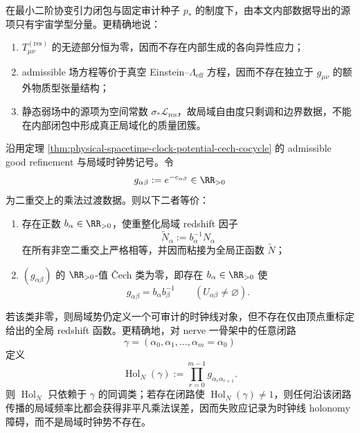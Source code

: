 \begin{corollary}[内部源项的宇宙学型刚性]\label{cor:physical-spacetime-no-localized-matter-source}
在最小二阶协变引力闭包与固定审计种子 \(p_\ast\) 的制度下，由本文内部数据导出的源项只有宇宙学型分量。更精确地说：
\begin{enumerate}
  \item \(T^{(\mathrm{res})}_{\mu\nu}\) 的无迹部分恒为零，因而不存在内部生成的各向异性应力；
  \item admissible 场方程等价于真空 Einstein--\(\Lambda_{\mathrm{eff}}\) 方程，因而不存在独立于 \(g_{\mu\nu}\) 的额外物质型张量结构；
  \item 静态弱场中的源项为空间常数 \(\sigma_\ast\mathcal L_{\mathrm{res}}\)，故局域自由度只剩调和边界数据，不能在内部闭包中形成真正局域化的质量团簇。
\end{enumerate}
\end{corollary}

\begin{theorem}\label{distill:grothendieck-descent_to_closure_theorem_chains-clock-line-descent-holonomy-normal-form}
沿用定理 \ref{thm:physical-spacetime-clock-potential-cech-cocycle} 的 admissible good refinement 与局域时钟势记号。令
\[
g_{\alpha\beta}:=e^{-c_{\alpha\beta}}\in\RR_{>0}
\]
为二重交上的乘法过渡数据。则以下二者等价：
\begin{enumerate}
  \item 存在正数 \(b_\alpha\in\RR_{>0}\)，使重整化局域 redshift 因子
  \[
  \widetilde N_\alpha:=b_\alpha^{-1}N_\alpha
  \]
  在所有非空二重交上严格相等，并因而粘接为全局正函数 \(\widetilde N\)；
  \item \((g_{\alpha\beta})\) 的 \(\RR_{>0}\)-值 \v{C}ech 类为零，即存在 \(b_\alpha\in\RR_{>0}\) 使
  \[
  g_{\alpha\beta}=b_\alpha b_\beta^{-1}
  \qquad(U_{\alpha\beta}\ne\varnothing).
  \]
\end{enumerate}
若该类非零，则局域势仍定义一个可审计的时钟线对象，但不存在仅由顶点重标定给出的全局 redshift 函数。更精确地，对 nerve 一骨架中的任意闭路
\[
\gamma=(\alpha_0,\alpha_1,\ldots,\alpha_m=\alpha_0)
\]
定义
\[
\operatorname{Hol}_N(\gamma):=\prod_{r=0}^{m-1}g_{\alpha_r\alpha_{r+1}}.
\]
则 \(\operatorname{Hol}_N\) 只依赖于 \(\gamma\) 的同调类；若存在闭路使 \(\operatorname{Hol}_N(\gamma)\ne1\)，则任何沿该闭路传播的局域频率比都会获得非平凡乘法误差，因而失败应记录为时钟线 holonomy 障碍，而不是局域时钟势不存在。
\end{theorem}

